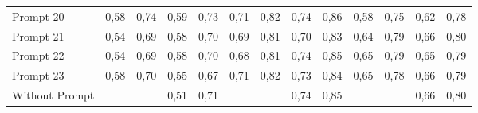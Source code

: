 \begin{tabular}{lrrrrrrrrrrrr}
Prompt 20         & 0,58                  & 0,74                    & 0,59                  & 0,73                    & 0,71                  & 0,82                    & 0,74                  & 0,86                    & 0,58                  & 0,75                    & 0,62                  & 0,78                    \\
Prompt 21         & 0,54                  & 0,69                    & 0,58                  & 0,70                    & 0,69                  & 0,81                    & 0,70                  & 0,83                    & 0,64                  & 0,79                    & 0,66                  & 0,80                    \\
Prompt 22         & 0,54                  & 0,69                    & 0,58                  & 0,70                    & 0,68                  & 0,81                    & 0,74                  & 0,85                    & 0,65                  & 0,79                    & 0,65                  & 0,79                    \\
Prompt 23         & 0,58                  & 0,70                    & 0,55                  & 0,67                    & 0,71                  & 0,82                    & 0,73                  & 0,84                    & 0,65                  & 0,78                    & 0,66                  & 0,79                    \\
Without Prompt    & \multicolumn{1}{l}{}  & \multicolumn{1}{l}{}    & 0,51                  & 0,71                    & \multicolumn{1}{l}{}  & \multicolumn{1}{l}{}    & 0,74                  & 0,85                    & \multicolumn{1}{l}{}  & \multicolumn{1}{l}{}    & 0,66                  & 0,80                   
\end{tabular}